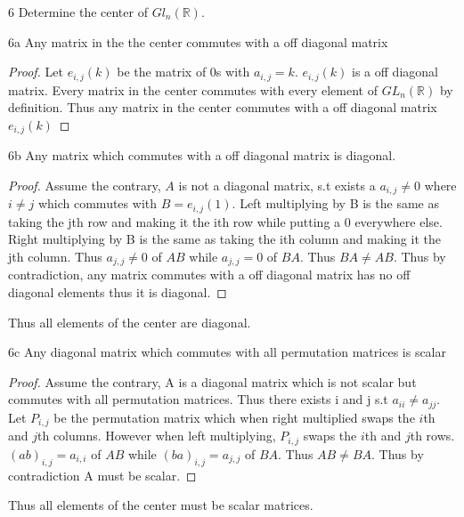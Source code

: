 \documentclass{article}
\newcommand{\R}{\mathbb{R}}
\begin{document}
\begin{PROB}{6}\label{Problem 6.}
    Determine the center of $Gl_n(\R)$.
\end{PROB}
\begin{claim}{6a}
    Any matrix in the the center commutes with a off diagonal matrix
\end{claim}
\begin{proof}
    Let $e_{i, j}(k)$ be the matrix of 0s with $a_{i, j} = k$. $e_{i, j}(k)$ is a off diagonal matrix.
    Every matrix in the center commutes with every element of $GL_n(\R)$ by definition. Thus any matrix in the center commutes with a off diagonal matrix $e_{i, j}(k)$
\end{proof}
\begin{claim}{6b}       
    Any matrix which commutes with a off diagonal matrix is diagonal.
\end{claim}
\begin{proof}
    Assume the contrary, $A$ is not a diagonal matrix, s.t exists a $a_{i, j} \neq 0$ where $i \neq j$ which commutes with $B = e_{i, j}(1)$. Left multiplying by B is the same as taking the jth row and making it the ith row while putting a 0 everywhere else. Right multiplying by B is the same as taking the ith column and making it the jth column. Thus $a_{j,j} \neq 0$ of $AB$ while $a_{j, j} = 0$ of $BA$. Thus $BA \neq AB$. Thus by contradiction, any matrix commutes with a off diagonal matrix has no off diagonal elements thus it is diagonal.
\end{proof}

Thus all elements of the center are diagonal.

\begin{claim}{6c}
    Any diagonal matrix which commutes with all permutation matrices is scalar
\end{claim}
\begin{proof}
    Assume the contrary, A is a diagonal matrix which is not scalar but commutes with all permutation matrices. Thus there exists i and j s.t $a_{ii} \neq a_{jj}$. Let $P_{i,j}$ be the permutation matrix which when right multiplied swaps the $i$th and $j$th columns. However when left multiplying, $P_{i, j}$ swaps the $i$th and $j$th rows. $(ab)_{i,j} = a_{i,i}$ of $AB$ while $(ba)_{i,j} = a_{j,j}$ of $BA$. Thus $AB \neq BA$. Thus by contradiction A must be scalar.
\end{proof}

Thus all elements of the center must be scalar matrices.
\end{document}
